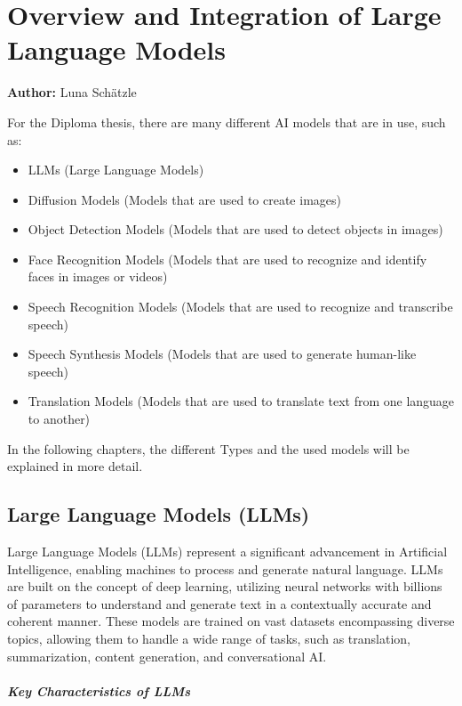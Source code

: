 \chapter{Overview and Integration of Large Language Models}
\label{cha:Introduction_to_the_used_Large_Language_Models}
\textbf{Author:} Luna Schätzle

For the Diploma thesis, there are many different AI models that are in use, such as:
\begin{itemize}
    \item LLMs (Large Language Models)
    \item Diffusion Models (Models that are used to create images)
    \item Object Detection Models (Models that are used to detect objects in images)
    \item Face Recognition Models (Models that are used to recognize and identify faces in images or videos)
    \item Speech Recognition Models (Models that are used to recognize and transcribe speech)
    \item Speech Synthesis Models (Models that are used to generate human-like speech)
    \item Translation Models (Models that are used to translate text from one language to another)
\end{itemize}

In the following chapters, the different Types and the used models will be explained in more detail.

\section{Large Language Models (LLMs)}

Large Language Models (LLMs) represent a significant advancement in Artificial Intelligence, enabling machines to process and generate natural language. 
LLMs are built on the concept of deep learning, utilizing neural networks with billions of parameters to understand and generate text in a contextually accurate 
and coherent manner. These models are trained on vast datasets encompassing diverse topics, allowing them to handle a wide range of tasks, such as translation, 
summarization, content generation, and conversational AI.

\paragraph{Key Characteristics of LLMs}

